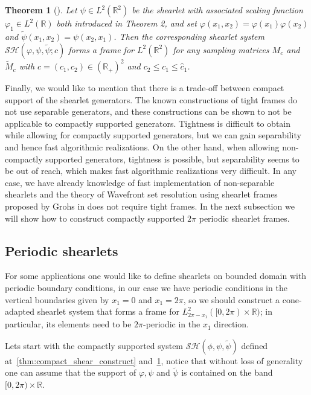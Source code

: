 \documentclass[a4paper]{article}
\newtheorem{theorem}{Theorem}
\begin{document}
\bigskip

\begin{theorem}[\cite{ConstructCompactShear}]
\label{thm:whole_frame}
Let $\psi\in L^2(\mathbb{R}^2)$ be the shearlet with associated scaling function $\varphi_1\in L^2(\mathbb{R})$ both introduced in Theorem 2, and set $\varphi(x_1,x_2)=\varphi(x_1)\varphi(x_2)$ and $\tilde{\psi}(x_1,x_2)=\psi(x_2,x_1)$. Then the corresponding shearlet system $\mathcal{SH}(\varphi,\psi,\tilde{\psi};c)$ forms a frame for $L^2(\mathbb{R}^2)$ for any sampling matrices $M_c$ and $\tilde{M}_c$ with $c=(c_1,c_2)\in (\mathbb{R}_+)^2$ and $c_2\leq c_1\leq \hat{c}_1$.
\end{theorem}

\bigskip

Finally, we would like to mention that there is a trade-off between compact support of the shearlet generators. The known constructions of tight frames do not use separable generators, and these constructions can be shown to not be applicable to compactly supported generators. Tightness is difficult to obtain while allowing for compactly supported generators, but we can gain separability and hence fast algorithmic realizations. On the other hand, when allowing non-compactly supported generators, tightness is possible, but separability seems to be out of reach, which makes fast algorithmic realizations very difficult. In any case, we have already knowledge of fast implementation of non-separable shearlets and the theory of Wavefront set resolution using shearlet frames proposed by Grohs in \cite{WaveFrontSetGrohs} does not require tight frames. In the next subsection we will show how to construct compactly supported $2\pi$ periodic shearlet frames.

\subsection{Periodic shearlets}

For some applications one would like to define shearlets on bounded domain with periodic boundary conditions, in our case we have periodic conditions in the vertical boundaries given by $x_1=0$ and $x_1=2\pi$, so we should construct a cone-adapted shearlet system that forms a frame for $L^2_{2\pi-x_1}([0,2\pi)\times\mathbb{R})$; in particular, its elements need to be $2\pi$-periodic in the $x_1$ direction.

\bigskip

Lets start with the compactly supported system $\mathcal{SH}(\phi,\psi,\tilde{\psi})$ defined at~\ref{thm:compact_shear_construct} and~\ref{thm:whole_frame}, notice that without loss of generality one can assume that the support of $\varphi,\psi$ and $\tilde{\psi}$ is contained on the band $[0,2\pi)\times \mathbb{R}$. 
\end{document}
